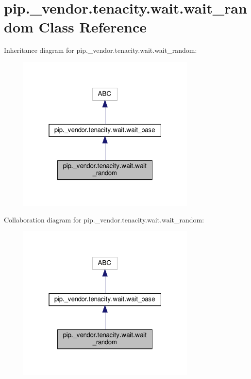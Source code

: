 \hypertarget{classpip_1_1__vendor_1_1tenacity_1_1wait_1_1wait__random}{}\section{pip.\+\_\+vendor.\+tenacity.\+wait.\+wait\+\_\+random Class Reference}
\label{classpip_1_1__vendor_1_1tenacity_1_1wait_1_1wait__random}


Inheritance diagram for pip.\+\_\+vendor.\+tenacity.\+wait.\+wait\+\_\+random\+:
\nopagebreak
\begin{figure}[H]
\begin{center}
\leavevmode
\includegraphics[width=253pt]{classpip_1_1__vendor_1_1tenacity_1_1wait_1_1wait__random__inherit__graph}
\end{center}
\end{figure}


Collaboration diagram for pip.\+\_\+vendor.\+tenacity.\+wait.\+wait\+\_\+random\+:
\nopagebreak
\begin{figure}[H]
\begin{center}
\leavevmode
\includegraphics[width=253pt]{classpip_1_1__vendor_1_1tenacity_1_1wait_1_1wait__random__coll__graph}
\end{center}
\end{figure}
